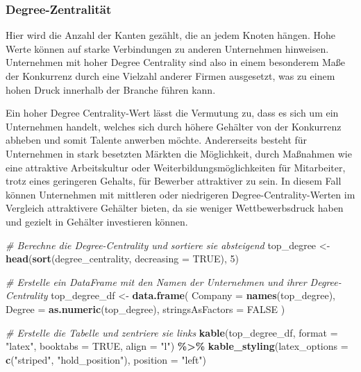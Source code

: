 \documentclass[
]{article}
\newenvironment{Shaded}{\begin{snugshade}}{\end{snugshade}}
\newcommand{\AttributeTok}[1]{\textcolor[rgb]{0.13,0.29,0.53}{#1}}
\newcommand{\CommentTok}[1]{\textcolor[rgb]{0.56,0.35,0.01}{\textit{#1}}}
\newcommand{\ConstantTok}[1]{\textcolor[rgb]{0.56,0.35,0.01}{#1}}
\newcommand{\DecValTok}[1]{\textcolor[rgb]{0.00,0.00,0.81}{#1}}
\newcommand{\FunctionTok}[1]{\textcolor[rgb]{0.13,0.29,0.53}{\textbf{#1}}}
\newcommand{\NormalTok}[1]{#1}
\newcommand{\OtherTok}[1]{\textcolor[rgb]{0.56,0.35,0.01}{#1}}
\newcommand{\SpecialCharTok}[1]{\textcolor[rgb]{0.81,0.36,0.00}{\textbf{#1}}}
\newcommand{\StringTok}[1]{\textcolor[rgb]{0.31,0.60,0.02}{#1}}
\begin{document}
\subsubsection{Degree-Zentralität}\label{degree-zentralituxe4t}

Hier wird die Anzahl der Kanten gezählt, die an jedem Knoten hängen.
Hohe Werte können auf starke Verbindungen zu anderen Unternehmen
hinweisen. Unternehmen mit hoher Degree Centrality sind also in einem
besonderem Maße der Konkurrenz durch eine Vielzahl anderer Firmen
ausgesetzt, was zu einem hohen Druck innerhalb der Branche führen kann.

Ein hoher Degree Centrality-Wert lässt die Vermutung zu, dass es sich um
ein Unternehmen handelt, welches sich durch höhere Gehälter von der
Konkurrenz abheben und somit Talente anwerben möchte. Andererseits
besteht für Unternehmen in stark besetzten Märkten die Möglichkeit,
durch Maßnahmen wie eine attraktive Arbeitskultur oder
Weiterbildungsmöglichkeiten für Mitarbeiter, trotz eines geringeren
Gehalts, für Bewerber attraktiver zu sein. In diesem Fall können
Unternehmen mit mittleren oder niedrigeren Degree-Centrality-Werten im
Vergleich attraktivere Gehälter bieten, da sie weniger Wettbewerbsdruck
haben und gezielt in Gehälter investieren können.

\begin{Shaded}
\begin{Highlighting}[]
\CommentTok{\# Berechne die Degree{-}Centrality und sortiere sie absteigend}
\NormalTok{top\_degree }\OtherTok{\textless{}{-}} \FunctionTok{head}\NormalTok{(}\FunctionTok{sort}\NormalTok{(degree\_centrality, }\AttributeTok{decreasing =} \ConstantTok{TRUE}\NormalTok{), }\DecValTok{5}\NormalTok{)}

\CommentTok{\# Erstelle ein DataFrame mit den Namen der Unternehmen und ihrer Degree{-}Centrality}
\NormalTok{top\_degree\_df }\OtherTok{\textless{}{-}} \FunctionTok{data.frame}\NormalTok{(}
  \AttributeTok{Company =} \FunctionTok{names}\NormalTok{(top\_degree),}
  \AttributeTok{Degree =} \FunctionTok{as.numeric}\NormalTok{(top\_degree),}
  \AttributeTok{stringsAsFactors =} \ConstantTok{FALSE}
\NormalTok{)}

\CommentTok{\# Erstelle die Tabelle und zentriere sie links}
\FunctionTok{kable}\NormalTok{(top\_degree\_df, }\AttributeTok{format =} \StringTok{"latex"}\NormalTok{, }\AttributeTok{booktabs =} \ConstantTok{TRUE}\NormalTok{, }\AttributeTok{align =} \StringTok{"l"}\NormalTok{) }\SpecialCharTok{\%\textgreater{}\%}
  \FunctionTok{kable\_styling}\NormalTok{(}\AttributeTok{latex\_options =} \FunctionTok{c}\NormalTok{(}\StringTok{"striped"}\NormalTok{, }\StringTok{"hold\_position"}\NormalTok{), }\AttributeTok{position =} \StringTok{"left"}\NormalTok{)}
\end{Highlighting}
\end{Shaded}
\end{document}
